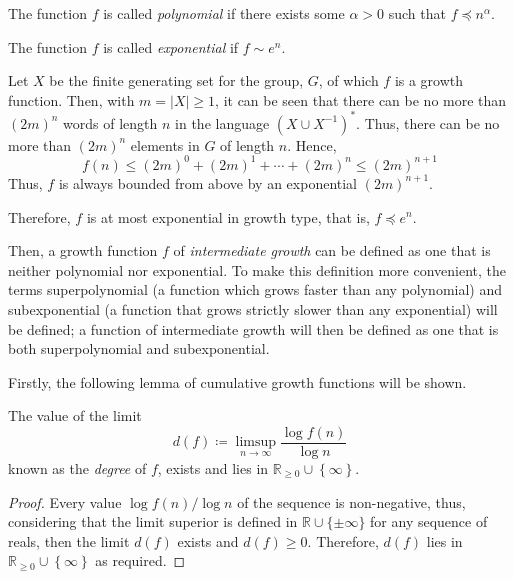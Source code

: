 \begin{definition}
	The function $f$ is called \emph{polynomial} if there exists some $\alpha > 0$ such that $f \preccurlyeq n^\alpha$.
\end{definition}

\begin{definition}
	The function $f$ is called \emph{exponential} if $f \sim e^n$.
	\thmendmark
\end{definition}

Let $X$ be the finite generating set for the group, $G$, of which $f$ is a growth function.
Then, with $m = \left\vert X \right\vert\geq 1$, it can be seen that there can be no more than $(2m)^n$ words of length $n$ in the language $\left( X \cup X^{-1} \right)^\ast$.
Thus, there can be no more than $(2m)^n$ elements in $G$ of length $n$.
Hence,
\[
  f(n) \leq
  (2m)^0 + (2m)^1 + \cdots + (2m)^n
  \leq
  (2m)^{n+1}
\]
Thus, $f$ is always bounded from above by an exponential $(2m)^{n+1}$.

Therefore, $f$ is at most exponential in growth type, that is, $f \preccurlyeq e^n$.

Then, a growth function $f$ of \emph{intermediate growth} can be defined as one that is neither polynomial nor exponential.
To make this definition more convenient, the terms superpolynomial (a function which grows faster than any polynomial) and subexponential (a function that grows strictly slower than any exponential) will be defined; a function of intermediate growth will then be defined as one that is both superpolynomial and subexponential.

Firstly, the following lemma of cumulative growth functions will be shown.

\begin{lemma}
	The value of the limit \[ d(f) \coloneqq \limsup_{n \to \infty} \frac{\log f(n)}{\log n} \] known as the \emph{degree} of $f$, exists and lies in $\mathbb{R}_{\geq 0} \cup \left\lbrace \infty \right\rbrace$.
\end{lemma}

\begin{proof}
	Every value $\log f(n) / \log n$ of the sequence is non-negative, thus, considering that the limit superior is defined in $\mathbb{R}\cup \lbrace \pm \infty \rbrace$ for any sequence of reals, then the limit $d(f)$ exists and $d(f)\geq 0$.
	Therefore, $d(f)$ lies in $\mathbb{R}_{\geq 0} \cup \left\lbrace \infty \right\rbrace$ as required.
\end{proof}

